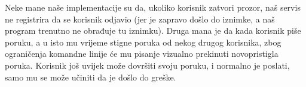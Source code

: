 \documentclass[10pt,a4paper,onecolumn,titlepage]{article}
\begin{document}
Neke mane naše implementacije su da, ukoliko korisnik zatvori prozor, naš servis
ne registrira da se korisnik odjavio (jer je zapravo došlo do iznimke, a naš
program trenutno ne obrađuje tu iznimku). Druga mana je da kada korisnik
piše poruku, a u isto mu vrijeme stigne poruka od nekog drugog korisnika,
zbog ograničenja komandne linije će mu pisanje vizualno prekinuti novopristigla
poruka. Korisnik još uvijek može dovršiti svoju poruku, i normalno je poslati,
samo mu se može učiniti da je došlo do greške.
\end{document}
